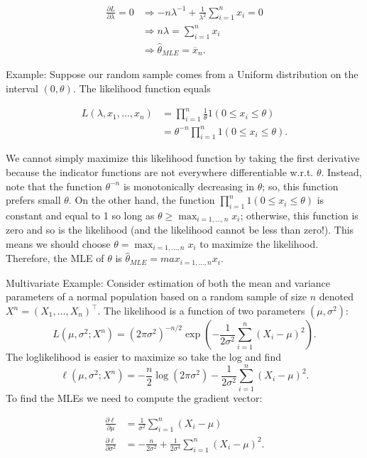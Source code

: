 \documentclass[]{book}
\begin{document}
\begin{align*}
\frac{\partial L}{\partial \lambda} = 0 & \Rightarrow -n\lambda^{-1} + \tfrac{1}{\lambda^2}\sum_{i=1}^n x_i = 0\\
& \Rightarrow n\lambda = \sum_{i=1}^n x_i\\
& \Rightarrow \hat{\theta}_{MLE} = \overline x_n.
\end{align*}

Example: Suppose our random sample comes from a Uniform distribution on
the interval \((0,\theta)\). The likelihood function equals

\begin{align*}
L(\lambda, x_1, \ldots, x_n) &= \prod_{i=1}^n \frac{1}{\theta}1(0\leq x_i\leq \theta) \\
& = \theta^{-n}\prod_{i=1}^n 1(0\leq x_i\leq \theta).
\end{align*}

We cannot simply maximize this likelihood function by taking the first
derivative because the indicator functions are not everywhere
differentiable w.r.t. \(\theta\). Instead, note that the function
\(\theta^{-n}\) is monotonically decreasing in \(\theta\); so, this
function prefers small \(\theta\). On the other hand, the function
\(\prod_{i=1}^n 1(0\leq x_i\leq \theta)\) is constant and equal to 1 so
long as \(\theta \geq \max_{i=1, \ldots, n} x_i\); otherwise, this
function is zero and so is the likelihood (and the likelihood cannot be
less than zero!). This means we should choose
\(\theta = \max_{i=1, \ldots, n} x_i\) to maximize the likelihood.
Therefore, the MLE of \(\theta\) is
\(\hat\theta_{MLE} = max_{i=1, \ldots, n} x_i\).

Multivariate Example: Consider estimation of both the mean and variance
parameters of a normal population based on a random sample of size \(n\)
denoted \(X^n = (X_1, \ldots, X_n)^\top\). The likelihood is a function
of two parameters \((\mu, \sigma^2)\):
\[L(\mu, \sigma^2;X^n) = (2\pi\sigma^2)^{-n/2}\exp\left(-\frac{1}{2\sigma^2}\sum_{i=1}^n (X_i-\mu)^2\right).\]
The loglikelihood is easier to maximize so take the log and find
\[\ell(\mu, \sigma^2;X^n) = -\frac{n}{2}\log (2\pi\sigma^2) -\frac{1}{2\sigma^2}\sum_{i=1}^n (X_i-\mu)^2. \]
To find the MLEs we need to compute the gradient vector:

\begin{align*}
\frac{\partial\ell}{\partial \mu} &= \frac{1}{\sigma^2}\sum_{i=1}^n (X_i-\mu)\\
\frac{\partial\ell}{\partial \sigma^2} &= -\frac{n}{2\sigma^2} + \frac{1}{2\sigma^4}\sum_{i=1}^n (X_i-\mu)^2.
\end{align*}
\end{document}
